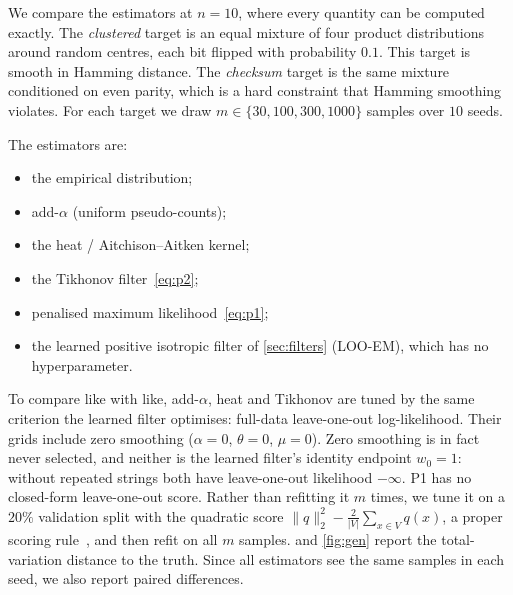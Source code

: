 We compare the estimators at $n=10$, where every quantity can be computed exactly. The \emph{clustered} target is an equal mixture of four product distributions around random centres, each bit flipped with probability $0.1$. This target is smooth in Hamming distance. The \emph{checksum} target is the same mixture conditioned on even parity, which is a hard constraint that Hamming smoothing violates. For each target we draw $m\in\{30,100,300,1000\}$ samples over $10$ seeds.

The estimators are:
\begin{itemize}
\item the empirical distribution;
\item add-$\alpha$ (uniform pseudo-counts);
\item the heat / Aitchison--Aitken kernel;
\item the Tikhonov filter~\eqref{eq:p2};
\item penalised maximum likelihood~\eqref{eq:p1};
\item the learned positive isotropic filter of \cref{sec:filters} (LOO-EM), which has no hyperparameter.
\end{itemize}
To compare like with like, add-$\alpha$, heat and Tikhonov are tuned by the same criterion the learned filter optimises: full-data leave-one-out log-likelihood. Their grids include zero smoothing ($\alpha=0$, $\theta=0$, $\mu=0$). Zero smoothing is in fact never selected, and neither is the learned filter's identity endpoint $w_0=1$: without repeated strings both have leave-one-out likelihood $-\infty$. P1 has no closed-form leave-one-out score. Rather than refitting it $m$ times, we tune it on a $20\%$ validation split with the quadratic score $\|q\|_2^2-\frac{2}{|V|}\sum_{x\in V}q(x)$, a proper scoring rule~\cite{gneiting2007scoring}, and then refit on all $m$ samples.  and \cref{fig:gen} report the total-variation distance to the truth. Since all estimators see the same samples in each seed, we also report paired differences.

